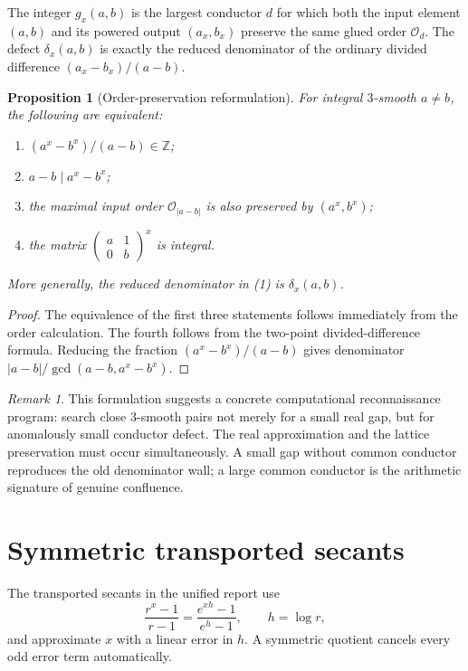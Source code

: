 \documentclass[11pt,oneside]{article}
\newtheorem{proposition}[theorem]{Proposition}
\theoremstyle{definition}
\theoremstyle{remark}
\newtheorem{remark}[theorem]{Remark}
\newcommand{\Z}{\mathbb Z}
\newcommand{\cO}{\mathcal O}
\begin{document}
The integer $g_x(a,b)$ is the largest conductor $d$ for which both the input element $(a,b)$
and its powered output $(a_x,b_x)$ preserve the same glued order $\cO_d$.  The defect
$\delta_x(a,b)$ is exactly the reduced denominator of the ordinary divided difference
$(a_x-b_x)/(a-b)$.

\begin{proposition}[Order-preservation reformulation]
\label{prop:orderreformulation}
For integral $3$-smooth $a\ne b$, the following are equivalent:
\begin{enumerate}
\item $(a^x-b^x)/(a-b)\in\Z$;
\item $a-b\mid a^x-b^x$;
\item the maximal input order $\cO_{|a-b|}$ is also preserved by $(a^x,b^x)$;
\item the matrix $\left(\begin{smallmatrix}a&1\\0&b\end{smallmatrix}\right)^x$ is integral.
\end{enumerate}
More generally, the reduced denominator in (1) is $\delta_x(a,b)$.
\end{proposition}

\begin{proof}
The equivalence of the first three statements follows immediately from the order calculation.
The fourth follows from the two-point divided-difference formula.  Reducing the fraction
$(a^x-b^x)/(a-b)$ gives denominator $|a-b|/\gcd(a-b,a^x-b^x)$.
\end{proof}

\begin{remark}
This formulation suggests a concrete computational reconnaissance program: search close
$3$-smooth pairs not merely for a small real gap, but for anomalously small conductor defect.
The real approximation and the lattice preservation must occur simultaneously.  A small gap
without common conductor reproduces the old denominator wall; a large common conductor is the
arithmetic signature of genuine confluence.
\end{remark}

\section{Symmetric transported secants}
\label{sec:symmetricsecants}

The transported secants in the unified report use
\[
 \frac{r^x-1}{r-1}
 =\frac{e^{xh}-1}{e^h-1},
 \qquad h=\log r,
\]
and approximate $x$ with a linear error in $h$.  A symmetric quotient cancels every odd error
term automatically.
\end{document}
